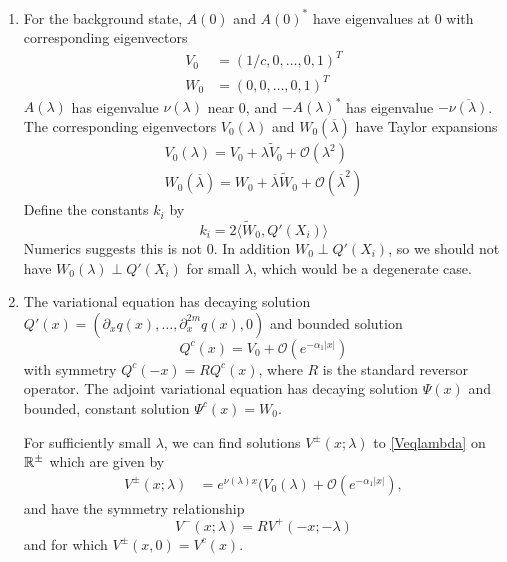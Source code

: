 \documentclass[thesis.tex]{subfiles}
\begin{document}
\begin{enumerate}
	\item For the background state, $A(0)$ and $A(0)^*$ have eigenvalues at 0 with corresponding eigenvectors
	\begin{align*}
	V_0 &= (1/c, 0, \dots, 0, 1)^T \\
	W_0 &= (0, 0, \dots, 0, 1)^T
	\end{align*}
	$A(\lambda)$ has eigenvalue $\nu(\lambda)$ near 0, and $-A(\lambda)^*$ has eigenvalue $-\overline{\nu(\lambda)}$. The corresponding eigenvectors $V_0(\lambda)$ and $W_0(\overline{\lambda})$ have Taylor expansions
	\begin{align}
	V_0(\lambda) = V_0 + \lambda \tilde{V}_0 + \mathcal{O}(\lambda^2) \label{V0expansion} \\
	W_0(\overline{\lambda}) = W_0 + \overline{\lambda} \tilde{W}_0 + \mathcal{O}(\overline{\lambda}^2) \label{W0expansion}
	\end{align}
	Define the constants $k_i$ by
	\begin{equation}\label{defki}
	k_i = 2 \langle \tilde{W}_0, Q'(X_i) \rangle
	\end{equation}
	Numerics suggests this is not 0. In addition $W_0 \perp Q'(X_i)$, so we should not have $W_0(\lambda) \perp Q'(X_i)$ for small $\lambda$, which would be a degenerate case.

	\item The variational equation has decaying solution $Q'(x) = (\partial_x q(x), \dots, \partial_x^{2m} q(x), 0)$ and bounded solution 
	\[
	Q^c(x) = V_0 + \mathcal{O}(e^{-\alpha_1 |x|})
	\]
	with symmetry $Q^c(-x) = R Q^c(x)$, where $R$ is the standard reversor operator. The adjoint variational equation has decaying solution $\Psi(x)$ and bounded, constant solution $\Psi^c(x) = W_0$.

	For sufficiently small $\lambda$, we can find solutions $V^\pm(x; \lambda)$ to \eqref{Veqlambda} on $\mathbb{R}^\pm$ which are given by
	\begin{align}\label{Vpmlambda}
	V^\pm(x; \lambda) &= e^{\nu(\lambda)x}(V_0(\lambda) + \mathcal{O}(e^{-\alpha_1 |x|}),
	\end{align}
	and have the symmetry relationship
	\begin{equation}\label{Vpmsymmetry}
	V^-(x; \lambda) = R V^+(-x; -\lambda)
	\end{equation}
	and for which $V^\pm(x, 0) = V^c(x)$. 


\end{enumerate}
\end{document}
